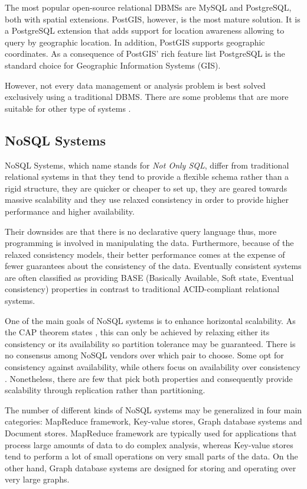 The most popular open-source relational DBMSs are MySQL and PostgreSQL, both with spatial extensions. PostGIS, however, is the most mature solution. It is a PostgreSQL extension that adds support for location awareness allowing to query by geographic location. In addition, PostGIS supports geographic coordinates. As a consequence of PostGIS' rich feature list PostgreSQL is the standard choice for Geographic Information Systems (GIS).

However, not every data management or analysis problem is best solved exclusively using a traditional DBMS. There are some problems that are more suitable for other type of systems \cite{NoSQL-use-cases}.

\subsection{NoSQL Systems}

NoSQL Systems, which name stands for \textit{Not Only SQL}, differ from traditional relational systems in that they tend to provide a flexible schema rather than a rigid structure, they are quicker or cheaper to set up, they are geared towards massive scalability and they use relaxed consistency in order to provide higher performance and higher availability.

Their downsides are that there is no declarative query language thus, more programming is involved in manipulating the data. Furthermore, because of the relaxed consistency models, their better performance comes at the expense of fewer guarantees about the consistency of the data. Eventually consistent systems are often classified as providing BASE (Basically Available, Soft state, Eventual consistency) properties in contrast to traditional ACID-compliant relational systems.

One of the main goals of NoSQL systems is to enhance horizontal scalability. As the CAP theorem states \cite{CAP-theorem}\cite{CAP:online}, this can only be achieved by relaxing either its consistency or its availability so partition tolerance may be guaranteed. There is no consensus among NoSQL vendors over which pair to choose. Some opt for consistency against availability, while others focus on availability over consistency \cite{CAP-NoSQL}. Nonetheless, there are few that pick both properties and consequently provide scalability through replication rather than partitioning.

The number of different kinds of NoSQL systems may be generalized in four main categories: MapReduce framework, Key-value stores, Graph database systems and Document stores. MapReduce framework are typically used for applications that process large amounts of data to do complex analysis, whereas Key-value stores tend to perform a lot of small operations on very small parts of the data. On the other hand, Graph database systems are designed for storing and operating over very large graphs.

